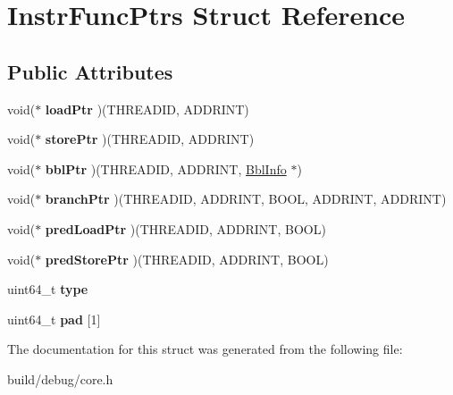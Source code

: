 \hypertarget{structInstrFuncPtrs}{\section{Instr\-Func\-Ptrs Struct Reference}
\label{structInstrFuncPtrs}
}
\subsection*{Public Attributes}
\begin{DoxyCompactItemize}
\item 
\hypertarget{structInstrFuncPtrs_a7c6744818f5d47c60f066d939629e03f}{void($\ast$ {\bfseries load\-Ptr} )(T\-H\-R\-E\-A\-D\-I\-D, A\-D\-D\-R\-I\-N\-T)}\label{structInstrFuncPtrs_a7c6744818f5d47c60f066d939629e03f}

\item 
\hypertarget{structInstrFuncPtrs_a033ef32c4a6f0db882e665e24d1a7aed}{void($\ast$ {\bfseries store\-Ptr} )(T\-H\-R\-E\-A\-D\-I\-D, A\-D\-D\-R\-I\-N\-T)}\label{structInstrFuncPtrs_a033ef32c4a6f0db882e665e24d1a7aed}

\item 
\hypertarget{structInstrFuncPtrs_a3dbf17378ec01f9b4c1632afd6cefec6}{void($\ast$ {\bfseries bbl\-Ptr} )(T\-H\-R\-E\-A\-D\-I\-D, A\-D\-D\-R\-I\-N\-T, \hyperlink{structBblInfo}{Bbl\-Info} $\ast$)}\label{structInstrFuncPtrs_a3dbf17378ec01f9b4c1632afd6cefec6}

\item 
\hypertarget{structInstrFuncPtrs_ac1443699cb66dc7655af1e0b42433aff}{void($\ast$ {\bfseries branch\-Ptr} )(T\-H\-R\-E\-A\-D\-I\-D, A\-D\-D\-R\-I\-N\-T, B\-O\-O\-L, A\-D\-D\-R\-I\-N\-T, A\-D\-D\-R\-I\-N\-T)}\label{structInstrFuncPtrs_ac1443699cb66dc7655af1e0b42433aff}

\item 
\hypertarget{structInstrFuncPtrs_a43e3a5545d5d2c5d268c6c4fd8521752}{void($\ast$ {\bfseries pred\-Load\-Ptr} )(T\-H\-R\-E\-A\-D\-I\-D, A\-D\-D\-R\-I\-N\-T, B\-O\-O\-L)}\label{structInstrFuncPtrs_a43e3a5545d5d2c5d268c6c4fd8521752}

\item 
\hypertarget{structInstrFuncPtrs_a6cdfa6c2eab79b7cfbd92e8f14fc0a56}{void($\ast$ {\bfseries pred\-Store\-Ptr} )(T\-H\-R\-E\-A\-D\-I\-D, A\-D\-D\-R\-I\-N\-T, B\-O\-O\-L)}\label{structInstrFuncPtrs_a6cdfa6c2eab79b7cfbd92e8f14fc0a56}

\item 
\hypertarget{structInstrFuncPtrs_a400c3a9cc3eab0f817c34674103262df}{uint64\-\_\-t {\bfseries type}}\label{structInstrFuncPtrs_a400c3a9cc3eab0f817c34674103262df}

\item 
\hypertarget{structInstrFuncPtrs_a67870a2a30a29a388f229248798e5e88}{uint64\-\_\-t {\bfseries pad} \mbox{[}1\mbox{]}}\label{structInstrFuncPtrs_a67870a2a30a29a388f229248798e5e88}

\end{DoxyCompactItemize}


The documentation for this struct was generated from the following file\-:\begin{DoxyCompactItemize}
\item 
build/debug/core.\-h\end{DoxyCompactItemize}

